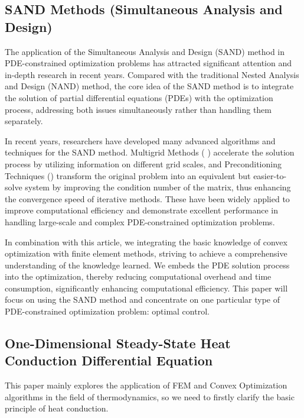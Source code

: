 \documentclass{article}
\begin{document}
    \subsection{SAND Methods (Simultaneous Analysis and Design)}
    The application of the Simultaneous Analysis and Design (SAND) method in PDE-constrained optimization problems has attracted significant attention and in-depth research in recent years. Compared with the traditional Nested Analysis and Design (NAND) method, the core idea of the SAND method is to integrate the solution of partial differential equations (PDEs) with the optimization process, addressing both issues simultaneously rather than handling them separately. 
    
    In recent years, researchers have developed many advanced algorithms and techniques for the SAND method. Multigrid Methods (\textcite{MultigridMethods} ) accelerate the solution process by utilizing information on different grid scales, and Preconditioning Techniques (\textcite{Preconditioningiterativemethods}) transform the original problem into an equivalent but easier-to-solve system by improving the condition number of the matrix, thus enhancing the convergence speed of iterative methods. These have been widely applied to improve computational efficiency and demonstrate excellent performance in handling large-scale and complex PDE-constrained optimization problems.

    In combination with this article, we integrating the basic knowledge of convex optimization with finite element methods, striving to achieve a comprehensive understanding of the knowledge learned. We embeds the PDE solution process into the optimization, thereby reducing computational overhead and time consumption, significantly enhancing computational efficiency. This paper will focus on using the SAND method and concentrate on one particular type of PDE-constrained optimization problem: optimal control.

    
    
    \subsection{One-Dimensional Steady-State Heat Conduction Differential Equation}
    This paper mainly explores the application of FEM and Convex Optimization algorithms in the field of thermodynamics, so we need to firstly clarify the basic principle of heat conduction.
    
\end{document}
